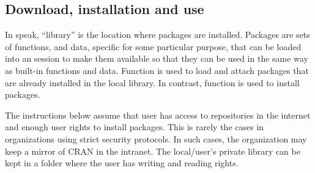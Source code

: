 \documentclass[krantz2]{krantz}\usepackage{knitr}
\begin{document}
\subsection{Download, installation and use}\label{sec:packages:install}

In \Rlang speak, ``library'' is the location where packages are installed. Packages are sets of functions, and data, specific for some particular purpose, that can be loaded into an \Rlang session to make them available so that they can be used in the same way as built-in \Rlang functions and data. Function  is used to load and attach packages that are already installed in the local \Rlang library. In contrast, function  is used to install packages.

\begin{warningbox}
The instructions below assume that user has access to repositories in the internet and enough user rights to install packages. This is rarely the cases in organizations using strict security protocols. In such cases, the organization may keep a mirror of CRAN in the intranet. The local/user's private \Rpgrm library can be kept in a folder where the user has writing and reading rights.
\end{warningbox}
\end{document}
